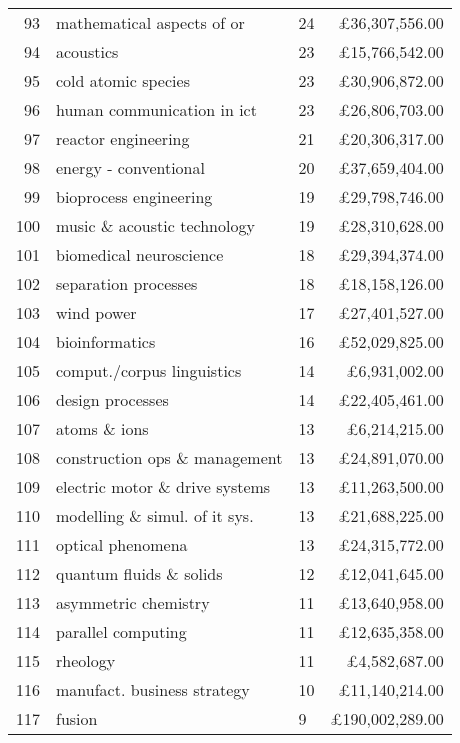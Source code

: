 \begin{spacing}{0.9}
\begin{longtable}[c]{r|>{\raggedleft\arraybackslash}m{6.5cm}|>{\raggedleft\arraybackslash}m{1.9cm}|r}
{93} & {mathematical aspects of or} & {24} & {\pounds36,307,556.00}\\
{94} & {acoustics} & {23} & {\pounds15,766,542.00}\\
{95} & {cold atomic species} & {23} & {\pounds30,906,872.00}\\
{96} & {human communication in ict} & {23} & {\pounds26,806,703.00}\\
{97} & {reactor engineering} & {21} & {\pounds20,306,317.00}\\
{98} & {energy - conventional} & {20} & {\pounds37,659,404.00}\\
{99} & {bioprocess engineering} & {19} & {\pounds29,798,746.00}\\
{100} & {music \& acoustic technology} & {19} & {\pounds28,310,628.00}\\
{101} & {biomedical neuroscience} & {18} & {\pounds29,394,374.00}\\
{102} & {separation processes} & {18} & {\pounds18,158,126.00}\\
{103} & {wind power} & {17} & {\pounds27,401,527.00}\\
{104} & {bioinformatics} & {16} & {\pounds52,029,825.00}\\
{105} & {comput./corpus linguistics} & {14} & {\pounds6,931,002.00}\\
{106} & {design processes} & {14} & {\pounds22,405,461.00}\\
{107} & {atoms \& ions} & {13} & {\pounds6,214,215.00}\\
{108} & {construction ops \& management} & {13} & {\pounds24,891,070.00}\\
{109} & {electric motor \& drive systems} & {13} & {\pounds11,263,500.00}\\
{110} & {modelling \& simul. of it sys.} & {13} & {\pounds21,688,225.00}\\
{111} & {optical phenomena} & {13} & {\pounds24,315,772.00}\\
{112} & {quantum fluids \& solids} & {12} & {\pounds12,041,645.00}\\
{113} & {asymmetric chemistry} & {11} & {\pounds13,640,958.00}\\
{114} & {parallel computing} & {11} & {\pounds12,635,358.00}\\
{115} & {rheology} & {11} & {\pounds4,582,687.00}\\
{116} & {manufact. business strategy} & {10} & {\pounds11,140,214.00}\\
{117} & {fusion} & {9} & {\pounds190,002,289.00}\\

\end{longtable}
\end{spacing}
